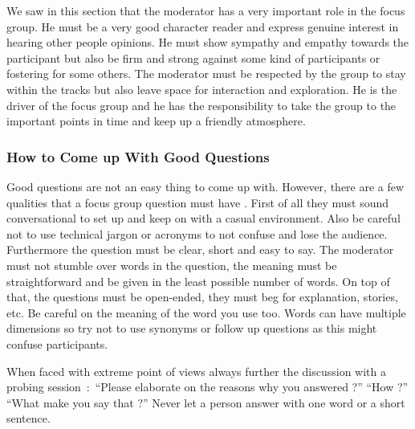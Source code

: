 \documentclass[10pt]{report}
\begin{document}
We saw in this section that the moderator has a very important role in the focus group. He must be a very good character reader and express genuine interest in hearing other people opinions. He must show sympathy and empathy towards the participant but also be firm and strong against some kind of participants or fostering for some others. The moderator must be respected by the group to stay within the tracks but also leave space for interaction and exploration. He is the driver of the focus group and he has the responsibility to take the group to the important points in time and keep up a friendly atmosphere.

\subsubsection{How to Come up With Good Questions}

Good questions are not an easy thing to come up with. However, there are a few qualities that a focus group question must have \autocite{Krueger2000}. First of all they must sound conversational to set up and keep on with a casual environment. Also be careful not to use technical jargon or acronyms to not confuse and lose the audience. Furthermore the question must be clear, short and easy to say. The moderator must not stumble over words in the question, the meaning must be straightforward and be given in the least possible number of words. On top of that, the questions must be open-ended, they must beg for explanation, stories, etc. Be careful on the meaning of the word you use too. Words can have multiple dimensions so try not to use synonyms or follow up questions as this might confuse participants.

When faced with extreme point of views always further the discussion with a probing session~:~\enquote{Please elaborate on the reasons why you answered ?} \enquote{How ?} \enquote{What make you say that ?} Never let a person answer with one word or a short sentence. \\
\end{document}
